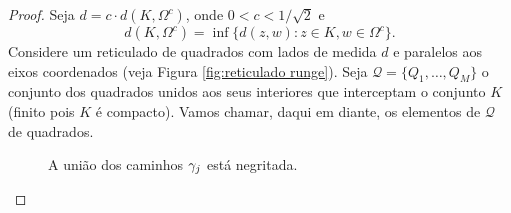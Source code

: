    \begin{proof}
        Seja $d = c \cdot d(K, \Omega^c)$, onde $0 < c < 1/\sqrt{2}$ e
        \begin{equation*}
        d(K, \Omega^c) = \inf \{d(z,w) : z \in K, w \in \Omega^c\}.
        \end{equation*}
        Considere um reticulado de quadrados com lados de medida $d$ e paralelos aos eixos 
        coordenados (veja Figura \ref{fig:reticulado runge}). Seja $\mathcal{Q} = \{Q_1, \dots, Q_M\}$ o conjunto 
        dos quadrados unidos aos seus interiores que interceptam o conjunto $K$ (finito pois
        $K$ é compacto). Vamos chamar, daqui em diante, os elementos de $\mathcal{Q}$ de quadrados.
        \begin{figure}[H]\centering
            \caption{A união dos caminhos $\gamma_j$ está negritada.}
\end{figure}
\end{proof}
